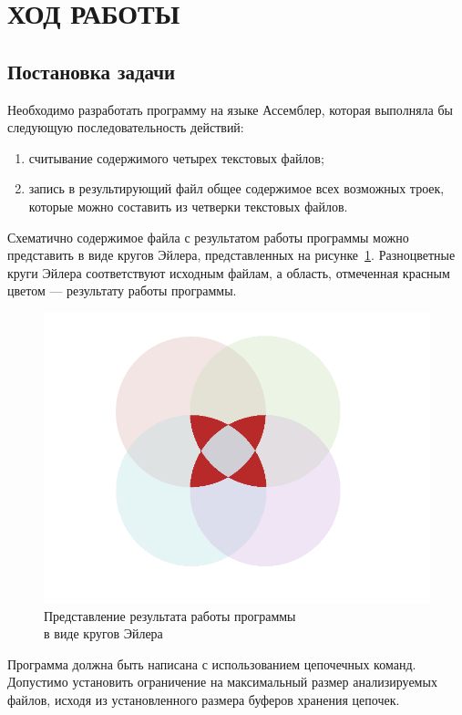 \section{ХОД РАБОТЫ}

\subsection{Постановка задачи}

Необходимо разработать программу на языке Ассемблер, 
которая выполняла бы следующую последовательность действий:

\begin{enumerate}
  \item считывание содержимого четырех текстовых файлов;
  \item запись в результирующий файл общее содержимое всех
    возможных троек, которые можно составить из четверки текстовых файлов.
\end{enumerate}

Схематично содержимое файла с результатом работы программы можно представить 
в виде кругов Эйлера, представленных на рисунке~\ref{pic:scheme}.
Разноцветные круги Эйлера соответствуют исходным файлам, а область, отмеченная
красным цветом --- результату работы программы.

\begin{figure}[h!]
  \centering
  \includegraphics[width=0.8\linewidth]{pic/scheme}
  \caption{Представление результата работы программы \\ в виде кругов Эйлера}
  \label{pic:scheme}
\end{figure}

Программа должна быть написана с использованием цепочечных команд.
Допустимо установить ограничение на максимальный размер анализируемых файлов,
исходя из установленного размера буферов хранения цепочек.

